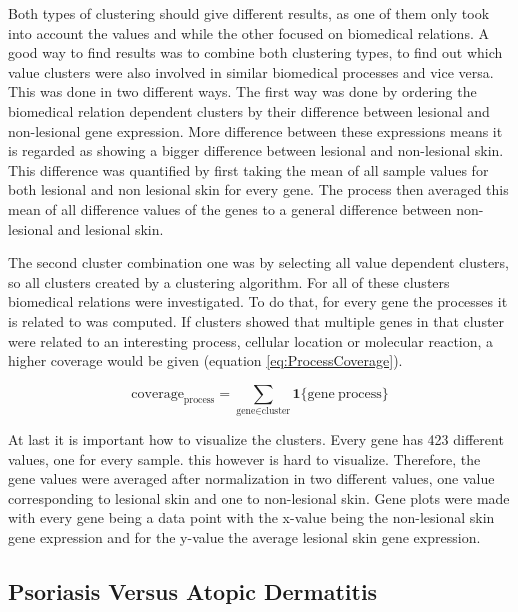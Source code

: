 \documentclass[10pt,a4paper]{article}
\begin{document}
	Both types of clustering should give different results, as one of them only took into account the values and while the other focused on biomedical relations. A good way to find results was to combine both clustering types, to find out which value clusters were also involved in similar biomedical processes and vice versa. This was done in two different ways. The first way was done by ordering the biomedical relation dependent clusters by their difference between lesional and non-lesional gene expression. More difference between these expressions means it is regarded as showing a bigger difference between lesional and non-lesional skin. This difference was quantified by first taking the mean of all sample values for both lesional and non lesional skin for every gene. The process then averaged this mean of all difference values of the genes to a general difference between non-lesional and lesional skin.
	
	The second cluster combination one was by selecting all value dependent clusters, so all clusters created by a clustering algorithm. For all of these clusters biomedical relations were investigated. To do that, for every gene the processes it is related to was computed. If clusters showed that multiple genes in that cluster were related to an interesting process, cellular location or molecular reaction, a higher coverage would be given (equation \ref{eq:ProcessCoverage}).
	
	\begin{equation}\label{eq:ProcessCoverage}
	\text{coverage}_{\text{process}} = \sum_{\text{gene} \in \text{cluster}} \textbf{1}\{\text{gene} ~ \text{process}\}
	\end{equation}
	
	At last it is important how to visualize the clusters. Every gene has 423 different values, one for every sample. this however is hard to visualize. Therefore, the gene values were averaged after normalization in two different values, one value corresponding to lesional skin and one to non-lesional skin. Gene plots were made with every gene being a data point with the x-value being the non-lesional skin gene expression and for the y-value the average lesional skin gene expression.
	
	\subsection{Psoriasis Versus Atopic Dermatitis}
	\label{subsec:MethodsPsoriasisVersusAtopicDermatitis}
	
\end{document}
